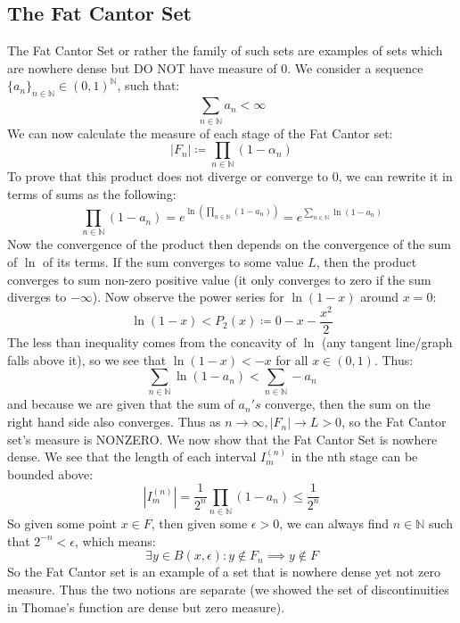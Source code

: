 \documentclass[10pt,letterpaper]{article} %
\begin{document}
\subsection{The Fat Cantor Set}
The Fat Cantor Set or rather the family of such sets are examples of sets which are nowhere dense but DO NOT have measure of 0. We consider a sequence $\{a_n\}_{n \in \mathbb{N}} \in (0, 1)^\mathbb{N}$, such that:
\begin{equation*}
  \sum_{n \in \mathbb{N}}a_n < \infty
\end{equation*}
We can now calculate the measure of each stage of the Fat Cantor set:
\begin{equation*}
  |F_n| \coloneq \prod_{n \in \mathbb{N}}(1 - \alpha_n)
\end{equation*}
To prove that this product does not diverge or converge to $0$, we can rewrite it in terms of sums as the following:
\begin{equation*}
  \prod_{n \in \mathbb{N}}(1 - a_n) = e^{\ln\left(\prod_{n \in \mathbb{N}}(1-a_n)\right)} = e^{\sum_{n \in \mathbb{N}}\ln(1-a_n)}
\end{equation*}
Now the convergence of the product then depends on the convergence of the sum of $\ln$ of its terms. If the sum converges to some value $L$, then the product converges to sum non-zero positive value (it only converges to zero if the sum diverges to $-\infty$). Now observe the power series for $\ln(1-x)$ around $x = 0$:
\begin{equation*}
  \ln(1-x) < P_2(x) \coloneq 0 - x - \frac{x^2}{2}
\end{equation*}
The less than inequality comes from the concavity of $\ln$ (any tangent line/graph falls above it), so we see that $\ln(1-x) < -x$ for all $x \in (0, 1)$. Thus:
\begin{equation*}
  \sum_{n \in \mathbb{N}}\ln(1-a_n) < \sum_{n \in \mathbb{N}} - a_n
\end{equation*}
and because we are given that the sum of $a_n's$ converge, then the sum on the right hand side also converges. Thus as $n \xrightarrow{} \infty, |F_n| \xrightarrow{} L > 0$, so the Fat Cantor set's measure is NONZERO. We now show that the Fat Cantor Set is nowhere dense. We see that the length of each interval $I_m^{(n)}$ in the nth stage can be bounded above:
\begin{equation*}
  |I_m^{(n)}| = \frac{1}{2^n}\prod_{n \in \mathbb{N}}(1- a_n) \leqslant \frac{1}{2^n}
\end{equation*}
So given some point $x \in F$, then given some $\epsilon > 0$, we can always find $n \in \mathbb{N}$ such that $2^{-n} < \epsilon$, which means:
\begin{equation*}
  \exists y \in B(x, \epsilon): y \notin F_n \implies y \notin F
\end{equation*}
So the Fat Cantor set is an example of a set that is nowhere dense yet not zero measure. Thus the two notions are separate (we showed the set of discontinuities in Thomae's function are dense but zero measure).
\end{document}
